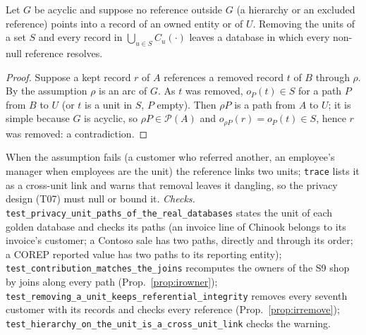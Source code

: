 \begin{proposition}\label{prop:irremove}
Let $G$ be acyclic and suppose no reference outside $G$ (a hierarchy or an excluded reference) points into a record of
an owned entity or of $U$. Removing the units of a set $S$ and every record in $\bigcup_{u\in S}C_u(\cdot)$ leaves a
database in which every non-null reference resolves.
\end{proposition}
\begin{proof}
Suppose a kept record $r$ of $A$ references a removed record $t$ of $B$ through $\rho$. By the assumption $\rho$ is an
arc of $G$. As $t$ was removed, $o_P(t)\in S$ for a path $P$ from $B$ to $U$ (or $t$ is a unit in $S$, $P$ empty).
Then $\rho P$ is a path from $A$ to $U$; it is simple because $G$ is acyclic, so $\rho P\in\mathcal P(A)$ and
$o_{\rho P}(r)=o_P(t)\in S$, hence $r$ was removed: a contradiction.
\end{proof}
\noindent When the assumption fails (a customer who referred another, an employee's manager when employees are the
unit) the reference links two units; \texttt{trace} lists it as a cross-unit link and warns that removal leaves it
dangling, so the privacy design (T07) must null or bound it. \emph{Checks.}
\texttt{test\_privacy\_unit\_paths\_of\_the\_real\_databases} states the unit of each golden database and checks its
paths (an invoice line of Chinook belongs to its invoice's customer; a Contoso sale has two paths, directly and
through its order; a COREP reported value has two paths to its reporting entity);
\texttt{test\_contribution\_matches\_the\_joins} recomputes the owners of the S9 shop by joins along every path
(Prop.~\ref{prop:irowner}); \texttt{test\_removing\_a\_unit\_keeps\_referential\_integrity} removes every seventh
customer with its records and checks every reference (Prop.~\ref{prop:irremove});
\texttt{test\_hierarchy\_on\_the\_unit\_is\_a\_cross\_unit\_link} checks the warning.
